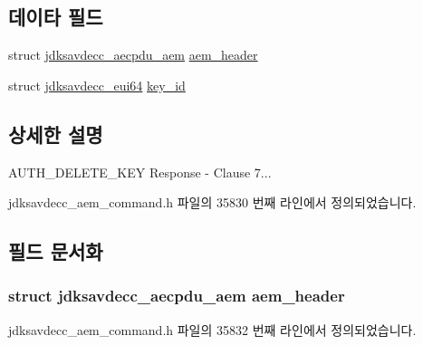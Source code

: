 \subsection*{데이타 필드}
\begin{DoxyCompactItemize}
\item 
struct \hyperlink{structjdksavdecc__aecpdu__aem}{jdksavdecc\+\_\+aecpdu\+\_\+aem} \hyperlink{structjdksavdecc__aem__command__auth__delete__key__response_ae1e77ccb75ff5021ad923221eab38294}{aem\+\_\+header}
\item 
struct \hyperlink{structjdksavdecc__eui64}{jdksavdecc\+\_\+eui64} \hyperlink{structjdksavdecc__aem__command__auth__delete__key__response_a37cbdf6056556ccfaee3ab01dc7c3032}{key\+\_\+id}
\end{DoxyCompactItemize}


\subsection{상세한 설명}
A\+U\+T\+H\+\_\+\+D\+E\+L\+E\+T\+E\+\_\+\+K\+EY Response -\/ Clause 7... 

jdksavdecc\+\_\+aem\+\_\+command.\+h 파일의 35830 번째 라인에서 정의되었습니다.



\subsection{필드 문서화}
\subsubsection[{\texorpdfstring{aem\+\_\+header}{aem_header}}]{\setlength{\rightskip}{0pt plus 5cm}struct {\bf jdksavdecc\+\_\+aecpdu\+\_\+aem} aem\+\_\+header}\hypertarget{structjdksavdecc__aem__command__auth__delete__key__response_ae1e77ccb75ff5021ad923221eab38294}{}\label{structjdksavdecc__aem__command__auth__delete__key__response_ae1e77ccb75ff5021ad923221eab38294}


jdksavdecc\+\_\+aem\+\_\+command.\+h 파일의 35832 번째 라인에서 정의되었습니다.

